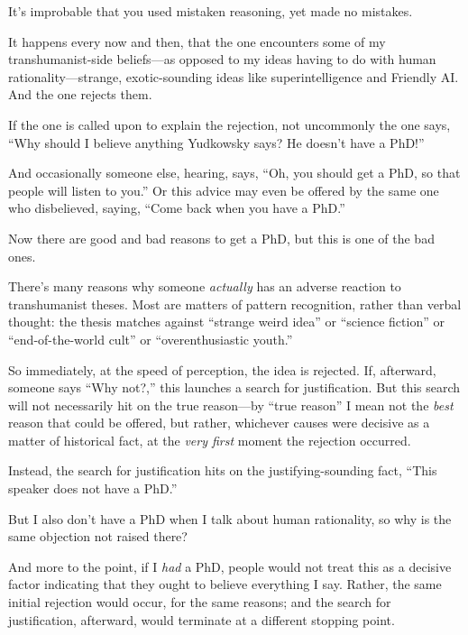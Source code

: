 {
 It's improbable that you used mistaken reasoning,
yet made no mistakes.}

\myendsectiontext


{
 It happens every now and then, that the one encounters some of my
transhumanist-side beliefs---as opposed to my ideas having to do with
human rationality---strange, exotic-sounding ideas like
superintelligence and Friendly AI. And the one rejects them. }

{
 If the one is called upon to explain the rejection, not uncommonly
the one says, ``Why should I believe anything
Yudkowsky says? He doesn't have a
PhD!''}

{
 And occasionally someone else, hearing, says,
``Oh, you should get a PhD, so that people will listen
to you.'' Or this advice may even be offered by the
same one who disbelieved, saying, ``Come back when you
have a PhD.''}

{
 Now there are good and bad reasons to get a PhD, but this is one
of the bad ones.}

{
 There's many reasons why someone \textit{actually}
has an adverse reaction to transhumanist theses. Most are matters of
pattern recognition, rather than verbal thought: the thesis matches
against ``strange weird idea'' or
``science fiction'' or
``end-of-the-world cult'' or
``overenthusiastic youth.''}

{
 So immediately, at the speed of perception, the idea is rejected.
If, afterward, someone says ``Why
not?,'' this launches a search for justification. But
this search will not necessarily hit on the true reason---by
``true reason'' I mean not the
\textit{best} reason that could be offered, but rather, whichever
causes were decisive as a matter of historical fact, at the
\textit{very first} moment the rejection occurred.}

{
 Instead, the search for justification hits on the
justifying-sounding fact, ``This speaker does not have
a PhD.''}

{
 But I also don't have a PhD when I talk about
human rationality, so why is the same objection not raised there?}

{
 And more to the point, if I \textit{had} a PhD, people would not
treat this as a decisive factor indicating that they ought to believe
everything I say. Rather, the same initial rejection would occur, for
the same reasons; and the search for justification, afterward, would
terminate at a different stopping point.}

